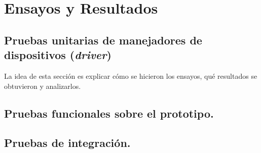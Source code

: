 
\chapter{Ensayos y Resultados} %

\label{Chapter4} %


\section{Pruebas unitarias de manejadores de dispositivos (\textit{driver})}

\label{sec:pruebasHW}

La idea de esta sección es explicar cómo se hicieron los ensayos, qué resultados se obtuvieron y analizarlos.

\section{Pruebas funcionales sobre el prototipo.}


\section{Pruebas de integración.}